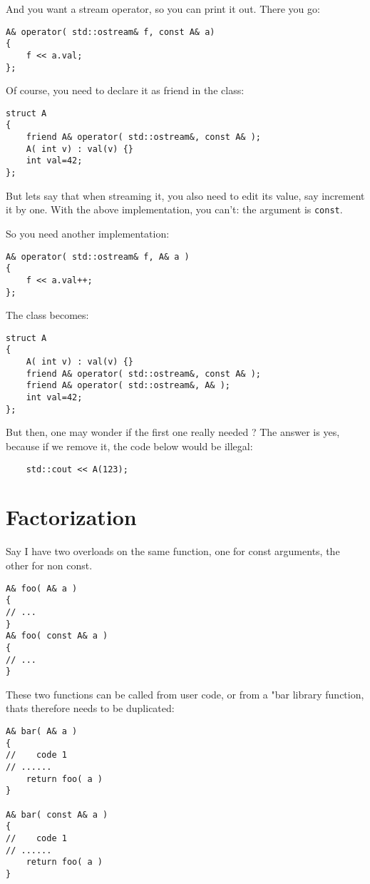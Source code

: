 \documentclass[11pt,a4paper,landscape,twocolumn]{article}
\begin{document}
And you want a stream operator, so you can print it out.
There you go:

\begin{lstlisting}
A& operator( std::ostream& f, const A& a)
{
	f << a.val;
};
\end{lstlisting}

Of course, you need to declare it as friend in the class:
\begin{lstlisting}
struct A
{
	friend A& operator( std::ostream&, const A& );
	A( int v) : val(v) {}
	int val=42;
};
\end{lstlisting}

But lets say that when streaming it, you also need to edit its value, say increment it by one.
With the above implementation, you can't: the argument is {\tt const}.

So you need another implementation:
\begin{lstlisting}
A& operator( std::ostream& f, A& a )
{
	f << a.val++;
};
\end{lstlisting}

The class becomes:
\begin{lstlisting}
struct A
{
	A( int v) : val(v) {}
	friend A& operator( std::ostream&, const A& );
	friend A& operator( std::ostream&, A& );
	int val=42;
};
\end{lstlisting}

But then, one may wonder if the first one really needed ?
The answer is yes, because if we remove it, the code below would be illegal:
\begin{lstlisting}
	std::cout << A(123);
\end{lstlisting}


\section{Factorization}

Say I have two overloads on the same function, one for const arguments, the other for non const.
\begin{lstlisting}
A& foo( A& a )
{
// ...
}
A& foo( const A& a )
{
// ...
}
\end{lstlisting}

These two functions can be called from user code, or from a "bar library function, thats therefore needs to be duplicated:
\begin{lstlisting}
A& bar( A& a )
{
//    code 1
// ......
	return foo( a )
}

A& bar( const A& a )
{
//    code 1
// ......
	return foo( a )
}
\end{lstlisting}
\end{document}
